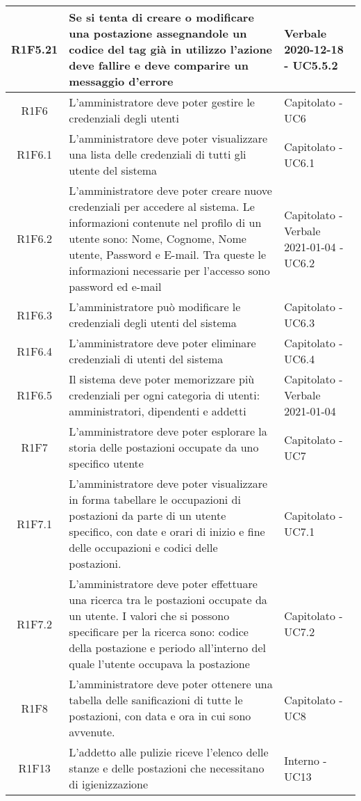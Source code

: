 \begin{center}
\begin{longtable}{|c|p{10cm}|p{4cm}|}
						\hline
			R1F5.21&Se si tenta di creare o modificare una postazione assegnandole un codice del tag già in utilizzo l'azione deve fallire e deve comparire un messaggio d'errore	&Verbale 2020-12-18 - UC5.5.2 	\\
					\hline
			R1F6&L'amministratore deve poter gestire le credenziali degli utenti	& Capitolato - UC6		\\
					\hline
R1F6.1&L'amministratore deve poter visualizzare una lista delle credenziali di tutti gli utente del sistema	& Capitolato - UC6.1	\\
					\hline
R1F6.2&L'amministratore deve poter creare nuove credenziali per accedere al sistema. Le informazioni contenute nel profilo di un utente sono: Nome, Cognome, Nome utente, Password e E-mail. Tra queste le informazioni necessarie per l'accesso sono password ed e-mail	& Capitolato - Verbale 2021-01-04 - UC6.2	\\
						\hline
			R1F6.3&L'amministratore può modificare le credenziali degli utenti del sistema	&Capitolato - UC6.3 	\\
					\hline
			R1F6.4&L'amministratore deve poter eliminare credenziali di utenti del sistema	& Capitolato - UC6.4	\\
					\hline
R1F6.5&Il sistema deve poter memorizzare più credenziali per ogni categoria di utenti: amministratori, dipendenti e addetti	& Capitolato - Verbale 2021-01-04	\\
					\hline
R1F7&L'amministratore deve poter esplorare la storia delle postazioni occupate da uno specifico utente	& Capitolato - UC7	\\
						\hline
			R1F7.1&L'amministratore deve poter visualizzare in forma tabellare le occupazioni di postazioni da parte di un utente specifico, con date e orari di inizio e fine delle occupazioni e codici delle postazioni.	&Capitolato - UC7.1 	\\
					\hline
			R1F7.2&L'amministratore deve poter effettuare una ricerca tra le postazioni occupate da un utente. I valori che si possono specificare per la ricerca sono: codice della postazione e periodo all'interno del quale l'utente occupava la postazione	& 	Capitolato - UC7.2\\
					\hline
R1F8&L'amministratore deve poter ottenere una tabella delle sanificazioni di tutte le postazioni, con data e ora in cui sono avvenute.	&Capitolato - UC8 	\\
					\hline
R1F13&L'addetto alle pulizie riceve l'elenco delle stanze e delle postazioni che necessitano di igienizzazione	& Interno - UC13	\\

\end{longtable}
\end{center}
